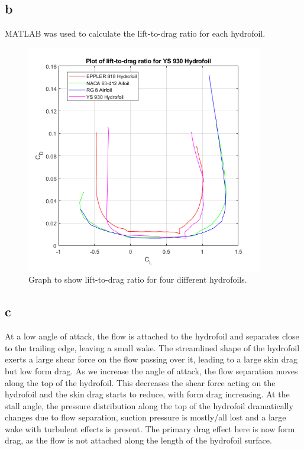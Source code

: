 \documentclass[11pt]{article}
\numberwithin{equation}{section}
\begin{document}
\subsection{b}
MATLAB was used to calculate the lift-to-drag ratio for each hydrofoil.

\begin{figure}[H]
    \centering
    \includegraphics[height = 10cm]{./img/q1b.png}
    \caption{Graph to show lift-to-drag ratio for four different hydrofoils.}
    \label{fig:q1b}
\end{figure}
\subsection{c}
At a low angle of attack, the flow is attached to the hydrofoil and separates close to the trailing edge, leaving a small wake. The streamlined shape of the hydrofoil exerts a large shear force on the flow passing over it, leading to a large skin drag but low form drag. As we increase the angle of attack, the flow separation moves along the top of the hydrofoil. This decreases the shear force acting on the hydrofoil and the skin drag starts to reduce, with form drag increasing. At the stall angle, the pressure distribution along the top of the hydrofoil dramatically changes due to flow separation, suction pressure is mostly/all lost and a large wake with turbulent effects is present. The primary drag effect here is now form drag, as the flow is not attached along the length of the hydrofoil surface.
\end{document}

